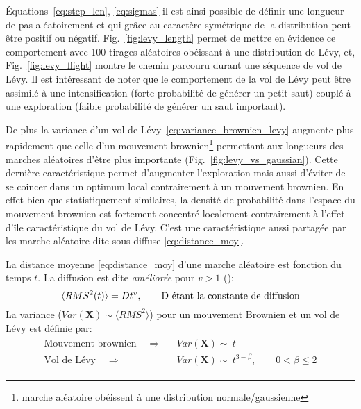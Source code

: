 Équations~\eqref{eq:step_len}, \eqref{eq:sigmas} il est ainsi possible de définir une longueur de pas aléatoirement et qui
grâce au caractère symétrique de la distribution peut être positif ou négatif.
Fig.~\ref{fig:levy_length} permet de mettre en évidence ce comportement avec 100 tirages aléatoires
obéissant à une distribution de Lévy, et, Fig.~\ref{fig:levy_flight} montre le chemin parcouru durant
une séquence de vol de Lévy. Il est intéressant de noter que le comportement de la
vol de Lévy peut être assimilé à une intensification (forte probabilité de générer un petit saut)
couplé à une exploration (faible probabilité de générer un saut important).

De plus la variance d’un vol de Lévy~\eqref{eq:variance_brownien_levy} augmente plus rapidement que celle d’un mouvement
brownien\footnote{marche aléatoire obéissent à une distribution normale/gaussienne}
permettant aux longueurs des marches aléatoires d’être plus importante (Fig.~\ref{fig:levy_vs_gaussian}).
Cette dernière caractéristique permet d’augmenter l’exploration mais aussi d’éviter
de se coincer dans un optimum local contrairement à un mouvement brownien. En effet
bien que statistiquement similaires, la densité de probabilité dans l’espace du mouvement brownien
est fortement concentré localement contrairement à l’effet d’île caractéristique du vol de Lévy.
C’est une caractéristique aussi partagée par les marche aléatoire dite sous-diffuse \eqref{eq:distance_moy}.

La distance moyenne \eqref{eq:distance_moy} d’une marche aléatoire est fonction du temps $t$. La diffusion est
dite \emph{améliorée} pour $v > 1$ (\cite{Gutowski2001}):
\begin{equation}\label{eq:distance_moy}
    \langle RMS^{2}(t) \rangle = Dt^{v}, \qquad \text{D étant la constante de diffusion}\\\\
\end{equation}
La variance ($Var(\mathbf{X}) \sim \langle RMS^{2}\rangle$) pour un mouvement Brownien
et un vol de Lévy est définie par:
\begin{align}\label{eq:variance_brownien_levy}
    \begin{split}
        \text{Mouvement brownien }  \quad \Rightarrow \quad & Var(\mathbf{X}) \sim \ t\\
        \text{Vol de Lévy }         \quad \Rightarrow \quad & Var(\mathbf{X}) \sim \ t^{3-\beta}, \qquad 0 < \beta \leq 2
    \end{split}
\end{align}

